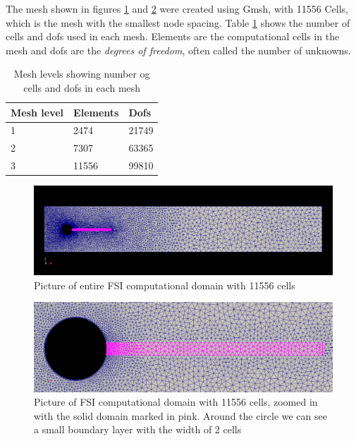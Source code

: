 The mesh shown in figures \ref{fig:fullmesh} and \ref{fig:partmesh} were created using Gmsh, with 11556 Cells, which is the mesh with the smallest node spacing. Table \ref{meshes} shows the number of cells and dofs used in each mesh. Elements are the computational cells in the mesh and dofs are the \textit{degrees of freedom}, often called the number of unknowns.

\begin{table}[H]
\centering
\begin{tabular}{|l|l|l|}
\hline
Mesh level & Elements & Dofs \\ \hline
1 & 2474 & 21749 \\ \hline
2 & 7307 & 63365 \\ \hline
3 & 11556 & 99810 \\ \hline
\end{tabular}
\caption{Mesh levels showing number og cells and dofs in each mesh}
\label{meshes}
\end{table}

\begin{figure}[H]
\centering
\includegraphics[scale=0.35,trim={20mm 34mm 20mm 30mm},clip]{./Verification_Validation/Hron_Turek/FSI_domain_b2.png}
\caption{Picture of entire FSI computational domain with 11556 cells}
\label{fig:fullmesh}
\end{figure}
\begin{figure}[H]
\centering
\includegraphics[scale=0.32,trim={0mm 0mm 0mm 0mm},clip]{./Verification_Validation/Hron_Turek/FSI_domain_b2_zoom.png}
\caption{Picture of FSI computational domain with 11556 cells, zoomed in with the solid domain marked in pink. Around the circle we can see a small boundary layer with the width of 2 cells}
\label{fig:partmesh}
\end{figure}



